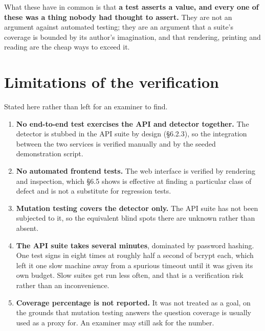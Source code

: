 What these have in common is that \textbf{a test asserts a value, and
every one of these was a thing nobody had thought to assert.} They are
not an argument against automated testing; they are an argument that a
suite's coverage is bounded by its author's imagination, and that
rendering, printing and reading are the cheap ways to exceed it.

\hypertarget{limitations-of-the-verification}{%
\section{Limitations of the
verification}\label{limitations-of-the-verification}}

Stated here rather than left for an examiner to find.

\begin{enumerate}
\def\labelenumi{\arabic{enumi}.}
\tightlist
\item
  \textbf{No end-to-end test exercises the API and detector together.}
  The detector is stubbed in the API suite by design (\S{}6.2.3), so the
  integration between the two services is verified manually and by the
  seeded demonstration script.
\item
  \textbf{No automated frontend tests.} The web interface is verified by
  rendering and inspection, which \S{}6.5 shows is effective at finding a
  particular class of defect and is not a substitute for regression
  tests.
\item
  \textbf{Mutation testing covers the detector only.} The API suite has
  not been subjected to it, so the equivalent blind spots there are
  unknown rather than absent.
\item
  \textbf{The API suite takes several minutes}, dominated by password
  hashing. One test signs in eight times at roughly half a second of
  bcrypt each, which left it one slow machine away from a spurious
  timeout until it was given its own budget. Slow suites get run less
  often, and that is a verification risk rather than an inconvenience.
\item
  \textbf{Coverage percentage is not reported.} It was not treated as a
  goal, on the grounds that mutation testing answers the question
  coverage is usually used as a proxy for. An examiner may still ask for
  the number.
\end{enumerate}
